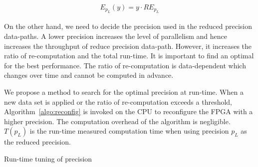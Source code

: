 \begin{equation}
\begin{aligned}
E_{p_L}(y) = y \cdot RE_{p_L}
\end{aligned}
\label{eqt:error}
\end{equation}

On the other hand, we need to decide the precision used in the reduced precision data-paths.
A lower precision increases the level of parallelism and hence increases the throughput of reduce precision data-path.
However, it increases the ratio of re-computation and the total run-time.
It is important to find an optimal for the best performance.
The ratio of re-computation is data-dependent which changes over time and cannot be computed in advance.

We propose a method to search for the optimal precision at run-time.
When a new data set is applied or the ratio of re-computation exceeds a threshold,
Algorithm~\ref{algo:reconfig} is invoked on the CPU to reconfigure the FPGA with a higher precision.
The computation overhead of the algorithm is negligible.
$T(p_L)$ is the run-time measured computation time when using precision $p_L$ as the reduced precision.

\begin{algorithm}[t!]
\caption{Run-time tuning of precision}
\begin{algorithmic}[1]
\REPEAT
\end{algorithmic}
\label{algo:reconfig}
\end{algorithm}



